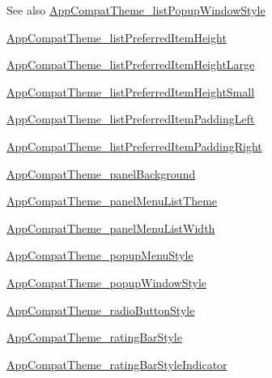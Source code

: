 \begin{DoxySeeAlso}{See also}
\hyperlink{classandroid_1_1support_1_1design_1_1R_1_1styleable_ab38358b7c84d4dbc393c9808d07c0427}{App\+Compat\+Theme\+\_\+list\+Popup\+Window\+Style} 

\hyperlink{classandroid_1_1support_1_1design_1_1R_1_1styleable_a8cff2e543a4edae5b403be6bb3c47eec}{App\+Compat\+Theme\+\_\+list\+Preferred\+Item\+Height} 

\hyperlink{classandroid_1_1support_1_1design_1_1R_1_1styleable_a183ea7959584cc75c934bead3330b82a}{App\+Compat\+Theme\+\_\+list\+Preferred\+Item\+Height\+Large} 

\hyperlink{classandroid_1_1support_1_1design_1_1R_1_1styleable_a3fb383aca061541233e8348ffa9b12fc}{App\+Compat\+Theme\+\_\+list\+Preferred\+Item\+Height\+Small} 

\hyperlink{classandroid_1_1support_1_1design_1_1R_1_1styleable_abd5288e1dbcfcf3972724d7aded718da}{App\+Compat\+Theme\+\_\+list\+Preferred\+Item\+Padding\+Left} 

\hyperlink{classandroid_1_1support_1_1design_1_1R_1_1styleable_a88a4a9392e587ed500ccdae581df5835}{App\+Compat\+Theme\+\_\+list\+Preferred\+Item\+Padding\+Right} 

\hyperlink{classandroid_1_1support_1_1design_1_1R_1_1styleable_a29b397614d1d7cf59c6c120c90e3b529}{App\+Compat\+Theme\+\_\+panel\+Background} 

\hyperlink{classandroid_1_1support_1_1design_1_1R_1_1styleable_a8c51cf0e087c4190c18f5548d4dfad15}{App\+Compat\+Theme\+\_\+panel\+Menu\+List\+Theme} 

\hyperlink{classandroid_1_1support_1_1design_1_1R_1_1styleable_aeff64b02915a67a11df8dde49e714e6d}{App\+Compat\+Theme\+\_\+panel\+Menu\+List\+Width} 

\hyperlink{classandroid_1_1support_1_1design_1_1R_1_1styleable_a98dfd09dfbb476ddbf9036698ee8bf9c}{App\+Compat\+Theme\+\_\+popup\+Menu\+Style} 

\hyperlink{classandroid_1_1support_1_1design_1_1R_1_1styleable_a2f386a19b0732d76a79e7a070ee99feb}{App\+Compat\+Theme\+\_\+popup\+Window\+Style} 

\hyperlink{classandroid_1_1support_1_1design_1_1R_1_1styleable_abf40525373a47503a3a32d0d28968936}{App\+Compat\+Theme\+\_\+radio\+Button\+Style} 

\hyperlink{classandroid_1_1support_1_1design_1_1R_1_1styleable_a489467c128791a96f0a6869127a31cba}{App\+Compat\+Theme\+\_\+rating\+Bar\+Style} 

\hyperlink{classandroid_1_1support_1_1design_1_1R_1_1styleable_acb5f552d97fb774eb23c5a37ac305002}{App\+Compat\+Theme\+\_\+rating\+Bar\+Style\+Indicator} 


\end{DoxySeeAlso}
